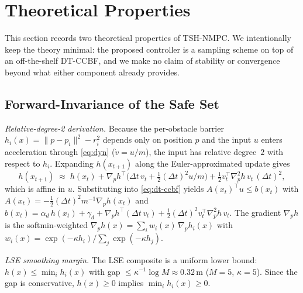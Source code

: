 \documentclass[11pt,onecolumn,a4paper]{article}
\begin{document}
\section{Theoretical Properties}\label{sec:theory}

This section records two theoretical properties of TSH-NMPC. We
intentionally keep the theory minimal: the proposed controller is a
sampling scheme on top of an off-the-shelf DT-CCBF, and we make no
claim of stability or convergence beyond what either component already
provides.

\subsection{Forward-Invariance of the Safe Set}

\emph{Relative-degree-2 derivation.}
Because the per-obstacle barrier $h_i(x) = \|p - p_i\|^2 - r_i^2$
depends only on position $p$ and the input $u$ enters acceleration
through \eqref{eq:dyn} ($\dot v = u/m$), the input has relative
degree~$2$ with respect to $h_i$. Expanding $h(x_{t+1})$ along the
Euler-approximated update gives
\begin{equation}\label{eq:rd2}
h(x_{t+1}) \;\approx\; h(x_t)
+ \nabla_p h^\top \big(\Delta t\, v_t + \tfrac{1}{2}(\Delta t)^2 u/m\big)
+ \tfrac{1}{2} v_t^\top \nabla_p^2 h\, v_t \,(\Delta t)^2,
\end{equation}
which is affine in $u$. Substituting into \eqref{eq:dt-ccbf} yields
$A(x_t)^\top u \le b(x_t)$ with
$A(x_t) = -\tfrac{1}{2}(\Delta t)^2 m^{-1} \nabla_p h(x_t)$ and
$b(x_t) = \alpha_d\, h(x_t) + \gamma_d +
\nabla_p h^\top (\Delta t\, v_t) + \tfrac{1}{2}(\Delta t)^2
v_t^\top \nabla_p^2 h\, v_t$.
The gradient $\nabla_p h$ is the softmin-weighted
$\nabla_p h(x) = \sum_i w_i(x)\, \nabla_p h_i(x)$ with
$w_i(x) = \exp(-\kappa h_i)/\sum_j \exp(-\kappa h_j)$.

\emph{LSE smoothing margin.}
The LSE composite is a uniform lower bound: $h(x) \le \min_i h_i(x)$
with gap $\le \kappa^{-1}\log M \approx 0.32\,$m ($M{=}5$,
$\kappa{=}5$). Since the gap is conservative, $h(x) \ge 0$ implies
$\min_i h_i(x) \ge 0$.
\end{document}
